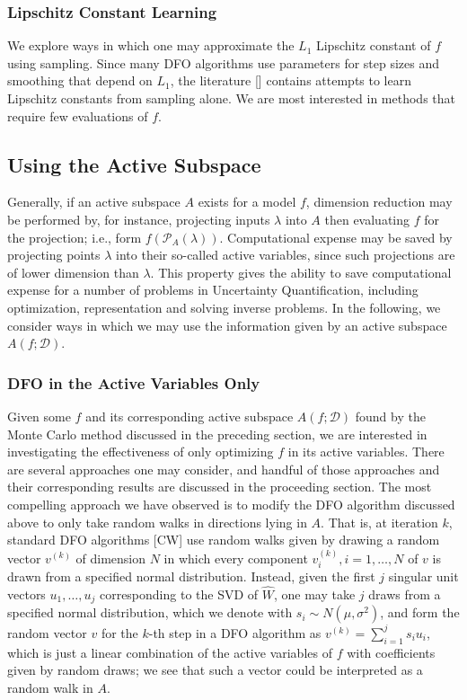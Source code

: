 \documentclass{amsart}
\begin{document}
\subsubsection{Lipschitz Constant Learning} We explore ways in which one may approximate the $L_1$ Lipschitz constant of $f$ using sampling. Since many DFO algorithms use parameters for step sizes and smoothing that depend on $L_1$, the literature [] contains attempts to learn Lipschitz constants from sampling alone. We are most interested in methods that require few evaluations of $f$.

\subsection{Using the Active Subspace} Generally, if an active subspace $A$ exists for a model $f$, dimension reduction may be performed by, for instance, projecting inputs $\lambda$ into $A$ then evaluating $f$ for the projection; i.e., form $f\left(\mathcal{P}_A(\lambda)\right)$. Computational expense may be saved by projecting points $\lambda$ into their so-called active variables, since such projections are of lower dimension than $\lambda$. This property gives the ability to save computational expense for a number of problems in Uncertainty Quantification, including optimization, representation and solving inverse problems. In the following, we consider ways in which we may use the information given by an active subspace $A(f;\mathcal{D})$.

\subsubsection{DFO in the Active Variables Only} Given some $f$ and its corresponding active subspace $A(f;\mathcal{D})$ found by the Monte Carlo method discussed in the preceding section, we are interested in investigating the effectiveness of only optimizing $f$ in its active variables. There are several approaches one may consider, and handful of those approaches and their corresponding results are discussed in the proceeding section. The most compelling approach we have observed is to modify the DFO algorithm discussed above to only take random walks in directions lying in $A$. That is, at iteration $k$, standard DFO algorithms [CW] use random walks given by drawing a random vector $v^{(k)}$ of dimension $N$ in which every component $v_i^{(k)},i=1,\ldots,N$ of $v$ is  drawn from a specified normal distribution. Instead, given the first $j$ singular unit vectors $u_1,\ldots,u_j$ corresponding to the SVD of $\hat{W}$, one may take $j$ draws from a specified normal distribution, which we denote with $s_i\sim N(\mu,\sigma^2)$, and form the random vector $v$ for the $k$-th step in a DFO algorithm as $v^{(k)}=\sum_{i=1}^js_iu_i$, which is just a linear combination of the active variables of $f$ with coefficients given by random draws; we see that such a vector could be interpreted as a random walk in $A$.
\end{document}

